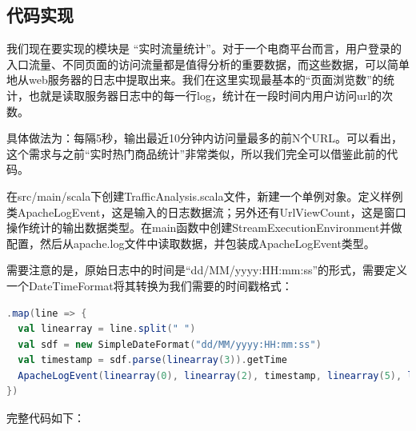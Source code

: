 \documentclass[oneside]{ctexbook}
\begin{document}
\subsection{代码实现}

我们现在要实现的模块是 “实时流量统计”。对于一个电商平台而言，用户登录的入口流量、不同页面的访问流量都是值得分析的重要数据，而这些数据，可以简单地从web服务器的日志中提取出来。我们在这里实现最基本的“页面浏览数”的统计，也就是读取服务器日志中的每一行log，统计在一段时间内用户访问url的次数。

具体做法为：每隔5秒，输出最近10分钟内访问量最多的前N个URL。可以看出，这个需求与之前“实时热门商品统计”非常类似，所以我们完全可以借鉴此前的代码。

在src/main/scala下创建TrafficAnalysis.scala文件，新建一个单例对象。定义样例类ApacheLogEvent，这是输入的日志数据流；另外还有UrlViewCount，这是窗口操作统计的输出数据类型。在main函数中创建StreamExecutionEnvironment并做配置，然后从apache.log文件中读取数据，并包装成ApacheLogEvent类型。

需要注意的是，原始日志中的时间是“dd/MM/yyyy:HH:mm:ss”的形式，需要定义一个DateTimeFormat将其转换为我们需要的时间戳格式：

\begin{lstlisting}[language=scala]
.map(line => {
  val linearray = line.split(" ")
  val sdf = new SimpleDateFormat("dd/MM/yyyy:HH:mm:ss")
  val timestamp = sdf.parse(linearray(3)).getTime
  ApacheLogEvent(linearray(0), linearray(2), timestamp, linearray(5), linearray(6))
})
\end{lstlisting}

完整代码如下：
\end{document}
